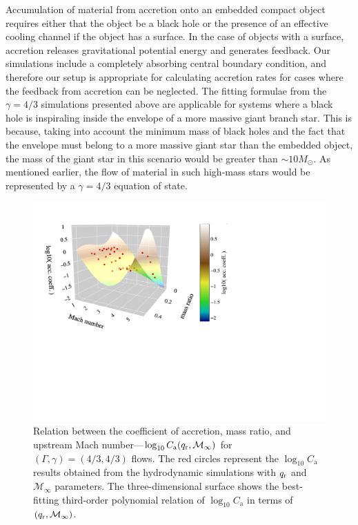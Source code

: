 Accumulation of material from accretion onto an embedded compact object requires either that the object be a black hole or the presence of an effective cooling channel if the object has a surface. In the case of objects with a surface, accretion releases gravitational potential energy and generates feedback. Our simulations include a completely absorbing central boundary condition, and therefore our setup is appropriate for calculating accretion rates for cases where the feedback from accretion can be neglected. The fitting formulae from the $\gamma = 4/3$ simulations presented above are applicable for systems where a black hole is inspiraling inside the envelope of a more massive giant branch star. This is because, taking into account the minimum mass of black holes and the fact that the envelope must belong to a more massive giant star than the embedded object, the mass of the giant star in this scenario would be greater than $\sim 10 M_\odot$. As mentioned earlier, the flow of material in such high-mass stars would be represented by a $\gamma = 4/3$ equation of state.  

\begin{figure}
  \centering
  \includegraphics[width=14cm]{figures/common_envelope/logmdot_order3_g43.pdf}
\caption{Relation between the coefficient of accretion, mass ratio, and upstream Mach number---$\log_{10}C_{\mathrm a} (q_{\rm r}, \mathcal{M}_\infty)$ for $(\Gamma, \gamma) = (4/3, 4/3)$ flows. The red circles represent the $\log_{10}C_{\mathrm a}$ results obtained from the hydrodynamic simulations with $q_{\rm r}$ and $\mathcal{M}_\infty$ parameters. The three-dimensional surface shows the best-fitting third-order polynomial relation of $\log_{10}C_{\mathrm a}$ in terms of $(q_{\rm r}, \mathcal{M}_\infty)$.\label{fig:logmdot_g43}}
\end{figure}

